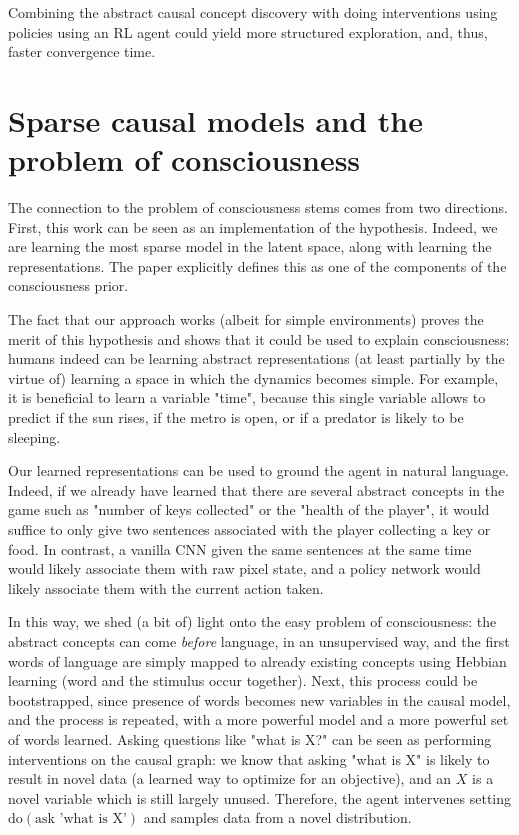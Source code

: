 \documentclass[a4paper,11pt,oneside]{report}
\begin{document}
Combining the abstract causal concept discovery with doing interventions using policies\cite{Volodin2020} using an RL agent could yield more structured exploration, and, thus, faster convergence time.


\section{Sparse causal models and the problem of consciousness}
The connection to the problem of consciousness stems comes from two directions. First, this work can be seen as an implementation of the \cite{Bengio2017} hypothesis. Indeed, we are learning the most sparse model in the latent space, along with learning the representations. The paper explicitly defines this as one of the components of the consciousness prior.


The fact that our approach works (albeit for simple environments) proves the merit of this hypothesis and shows that it could be used to explain consciousness: humans indeed can be learning abstract representations (at least partially by the virtue of) learning a space in which the dynamics becomes simple. For example, it is beneficial to learn a variable "time", because this single variable allows to predict if the sun rises, if the metro is open, or if a predator is likely to be sleeping.

Our learned representations can be used to ground the agent in natural language. Indeed, if we already have learned that there are several abstract concepts in the game such as "number of keys collected" or the "health of the player", it would suffice to only give two sentences associated with the player collecting a key or food. In contrast, a vanilla CNN given the same sentences at the same time would likely associate them with raw pixel state, and a policy network would likely associate them with the current action taken.

In this way, we shed (a bit of) light onto the easy problem of consciousness: the abstract concepts can come {\em before} language, in an unsupervised way, and the first words of language are simply mapped to already existing concepts using Hebbian learning (word and the stimulus occur together). Next, this process could be bootstrapped, since presence of words becomes new variables in the causal model, and the process is repeated, with a more powerful model and a more powerful set of words learned. Asking questions like "what is X?" can be seen as performing interventions on the causal graph: we know that asking "what is X" is likely to result in novel data (a learned way to optimize for an objective), and an $X$ is a novel variable which is still largely unused. Therefore, the agent intervenes setting $\mbox{do}(\mbox{ask 'what is X'})$ and samples data from a novel distribution.
\end{document}
